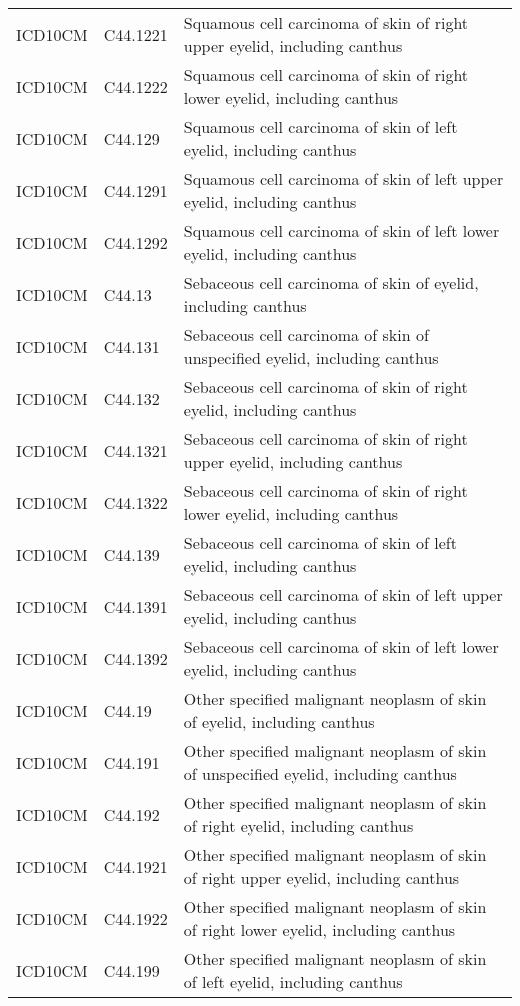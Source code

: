 \begin{table}[ht]
\begin{tabular}{lll}
  ICD10CM & C44.1221 & Squamous cell carcinoma of skin of right upper eyelid, including canthus \\ 
  ICD10CM & C44.1222 & Squamous cell carcinoma of skin of right lower eyelid, including canthus \\ 
  ICD10CM & C44.129 & Squamous cell carcinoma of skin of left eyelid, including canthus \\ 
  ICD10CM & C44.1291 & Squamous cell carcinoma of skin of left upper eyelid, including canthus \\ 
  ICD10CM & C44.1292 & Squamous cell carcinoma of skin of left lower eyelid, including canthus \\ 
  ICD10CM & C44.13 & Sebaceous cell carcinoma of skin of eyelid, including canthus \\ 
  ICD10CM & C44.131 & Sebaceous cell carcinoma of skin of unspecified eyelid, including canthus \\ 
  ICD10CM & C44.132 & Sebaceous cell carcinoma of skin of right eyelid, including canthus \\ 
  ICD10CM & C44.1321 & Sebaceous cell carcinoma of skin of right upper eyelid, including canthus \\ 
  ICD10CM & C44.1322 & Sebaceous cell carcinoma of skin of right lower eyelid, including canthus \\ 
  ICD10CM & C44.139 & Sebaceous cell carcinoma of skin of left eyelid, including canthus \\ 
  ICD10CM & C44.1391 & Sebaceous cell carcinoma of skin of left upper eyelid, including canthus \\ 
  ICD10CM & C44.1392 & Sebaceous cell carcinoma of skin of left lower eyelid, including canthus \\ 
  ICD10CM & C44.19 & Other specified malignant neoplasm of skin of eyelid, including canthus \\ 
  ICD10CM & C44.191 & Other specified malignant neoplasm of skin of unspecified eyelid, including canthus \\ 
  ICD10CM & C44.192 & Other specified malignant neoplasm of skin of right eyelid, including canthus \\ 
  ICD10CM & C44.1921 & Other specified malignant neoplasm of skin of right upper eyelid, including canthus \\ 
  ICD10CM & C44.1922 & Other specified malignant neoplasm of skin of right lower eyelid, including canthus \\ 
  ICD10CM & C44.199 & Other specified malignant neoplasm of skin of left eyelid, including canthus \\ 

\end{tabular}
\end{table}
